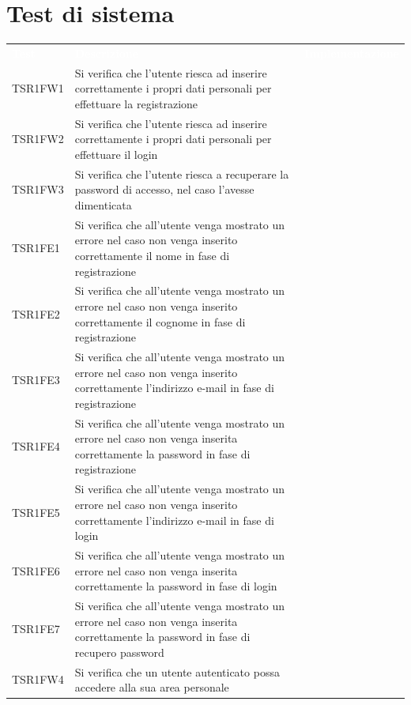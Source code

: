 \section{Test di sistema}
\renewcommand{\arraystretch}{1.5}
\begin{longtable}{ m{}<{\centering}  m{}<{\centering}  m{}<{\centering} }
	\rowcolor{darkblue}
	\textcolor{white}{\textbf{Test}} &\textcolor{white}{\textbf{Descrizione}} & \textcolor{white}{\textbf{Implementazione}} \\ 

	TSR1FW1 & Si verifica che l'utente riesca ad inserire correttamente i propri dati personali per effettuare la registrazione & \Ni \\
	TSR1FW2 & Si verifica che l'utente riesca ad inserire correttamente i propri dati personali per effettuare il login & \Ni \\
	TSR1FW3 & Si verifica che l'utente riesca a recuperare la password di accesso, nel caso l'avesse dimenticata & \Ni \\
	TSR1FE1 & Si verifica che all'utente venga mostrato un errore nel caso non venga inserito correttamente il nome in fase di registrazione & \Ni \\
	TSR1FE2 & Si verifica che all'utente venga mostrato un errore nel caso non venga inserito correttamente il cognome in fase di registrazione & \Ni \\
	TSR1FE3 & Si verifica che all'utente venga mostrato un errore nel caso non venga inserito correttamente l'indirizzo e-mail in fase di registrazione & \Ni \\
	TSR1FE4 & Si verifica che all'utente venga mostrato un errore nel caso non venga inserita correttamente la password in fase di registrazione & \Ni \\
	TSR1FE5 & Si verifica che all'utente venga mostrato un errore nel caso non venga inserito correttamente l'indirizzo e-mail in fase di login & \Ni \\
	TSR1FE6 & Si verifica che all'utente venga mostrato un errore nel caso non venga inserita correttamente la password in fase di login & \Ni \\
	TSR1FE7 & Si verifica che all'utente venga mostrato un errore nel caso non venga inserita correttamente la password in fase di recupero password & \Ni \\
	TSR1FW4 & Si verifica che un utente autenticato possa accedere alla sua area personale & \Ni \\

\end{longtable}
